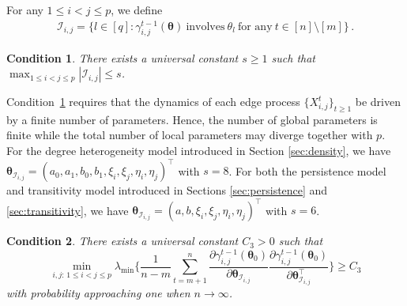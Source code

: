 \documentclass[12pt]{article}
\newtheorem{condition}{Condition}
\newtheorem{remark}{Remark}
\newcommand{\bTheta}{\boldsymbol \Theta}
\newcommand{\btheta}{\boldsymbol \theta}
\def\T{{\scriptscriptstyle \top} }
\newcommand{\0}{{\bf 0}}
\begin{document}
For any $1\leq i<j\leq p$, we define 
\begin{align*}
\mathcal{I}_{i,j}=\big\{l\in [q]:\gamma_{i,j}^{t-1}(\btheta)~\textrm{involves}~\theta_l~\textrm{for any}~t\in[n]\setminus[m]\big\}\,.
\end{align*}



\begin{condition}\label{as:bdSij}
There exists a universal constant $s\geq1$ such that
$
\max_{1\leq i<j\leq p}|\mathcal{I}_{i,j}|\leq s
$.
\end{condition}

Condition~{\rm\ref{as:bdSij}} requires that the dynamics of each edge process $\{X_{i,j}^t\}_{t\ge 1}$ be driven by a finite number of  parameters. Hence, the number of global parameters is finite while the total number of local parameters may diverge together with $p$. For the degree heterogeneity model introduced in Section {\rm\ref{sec:density}}, we have $\btheta_{\mathcal{I}_{i,j}}  = (a_0,a_1,b_0,b_1,\xi_i,\xi_j, \eta_i,\eta_j)^{\T}$ with $s = 8$. For both the persistence model and transitivity model introduced in Sections {\rm\ref{sec:persistence}} and {\rm\ref{sec:transitivity}}, we have $\btheta_{\mathcal{I}_{i,j}}  = (a,b,\xi_i,\xi_j,\eta_i,\eta_j)^{\T}$ with $s=6$.

\begin{condition}\label{as:eigen}
There exists a universal constant $C_3>0$ such that
\[
\min_{i,j:\,1\leq i<j\leq p}\lambda_{\min}\bigg\{\frac{1}{n-m}\sum_{t=m+1}^n\frac{\partial\gamma_{i,j}^{t-1}(\btheta_0)}{\partial\btheta_{\mathcal{I}_{i,j}}}\frac{\partial\gamma_{i,j}^{t-1}(\btheta_0)}{\partial\btheta_{\mathcal{I}_{i,j}}^{\T}}\bigg\}\geq C_3
\]
with probability approaching one when $n\to \infty$. 
\end{condition}
\end{document}
